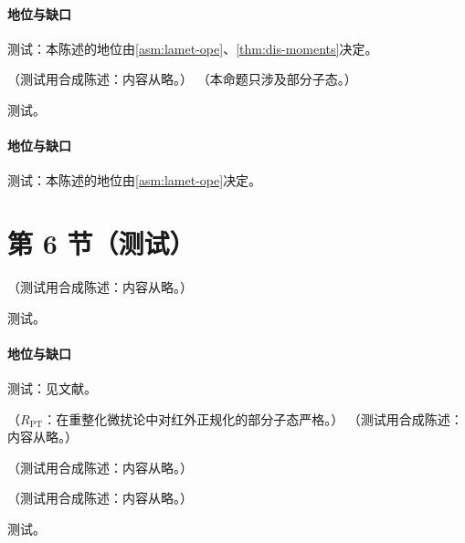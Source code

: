 \paragraph{地位与缺口}测试：本陈述的地位由\cref{asm:lamet-ope}、\cref{thm:dis-moments}决定。

\begin{theorem}\label{thm:lattice-lamet}
（测试用合成陈述：内容从略。）
（本命题只涉及部分子态。）
\end{theorem}
\begin{proofsketch}测试。\end{proofsketch}
\paragraph{地位与缺口}测试：本陈述的地位由\cref{asm:lamet-ope}决定。

\section{第 6 节（测试）}\label{sec:lamet-oneloop}

\begin{proposition}\label{prop:lamet-gluon-singlet}
（测试用合成陈述：内容从略。）
\end{proposition}
\begin{proofsketch}测试。\end{proofsketch}
\paragraph{地位与缺口}测试：见文献。

\begin{proposition}\label{prop:lamet-hybrid-kernel}
（$R_{\mathrm{PT}}$：在重整化微扰论中对红外正规化的部分子态严格。）
（测试用合成陈述：内容从略。）
\end{proposition}

\begin{example}[混合核的归一化]\label{ex:lamet-hybrid-normalization}
（测试用合成陈述：内容从略。）
\end{example}

\begin{proposition}\label{prop:lamet-scheme-validity}
（测试用合成陈述：内容从略。）
\end{proposition}
\begin{proofsketch}测试。\end{proofsketch}
